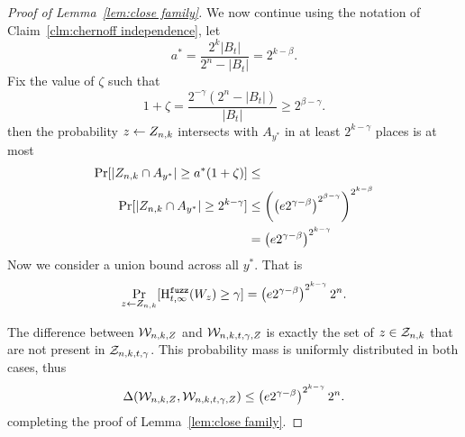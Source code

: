 \begin{proof}[Proof of Lemma~\ref{lem:close family}]
\noindent
We now continue using the notation of Claim~\ref{clm:chernoff independence}, let 
\[
a^* =\frac{2^k|B_t|}{2^n - |B_t|}=2^{k-\beta}.
\]
Fix the value of $\zeta$ such that 
\[1+\zeta = \frac{2^{-\gamma}(2^n - |B_t|)}{|B_t|} \ge 2^{\beta-\gamma}. \]
then the probability $z\leftarrow Z_{n,k}$ intersects with $A_{y^*}$ in at least $2^{k-\gamma}$ places is at most 
\begin{align*}
\Pr[|Z_{n,k} \cap A_{y^*}| \ge a^*(1+\zeta)] &\le \\
\Pr[| Z_{n,k} \cap A_{y^*} | \ge 2^{k-\gamma}] &\le \left(\left(e2^{\gamma-\beta}\right)^{2^{\beta-\gamma}}\right)^{2^{k-\beta}} \\&= \left(e2^{\gamma-\beta}\right)^{2^{k-\gamma}}
\end{align*}
Now we consider a union bound across all $y^*$.  That is
\[
\Pr_{z\leftarrow Z_{n,k} }[\mathrm{H}^{\mathtt{fuzz}}_{t,\infty}(W_z)\ge \gamma] = \left(e2^{\gamma-\beta}\right)^{2^{k-\gamma}}2^n.
\]

The difference between $\mathcal{W}_{n,k, Z}$ and $\mathcal{W}_{n,k,t,\gamma, Z}$ is exactly the set of $z\in\mathcal{Z}_{n,k}$ that are not present in $\mathcal{Z}_{n,k,t,\gamma}$.  This probability mass is uniformly distributed in both cases, thus 
\[
\Delta(\mathcal{W}_{n,k, Z}, \mathcal{W}_{n,k,t,\gamma, Z}) \le \left(e2^{\gamma-\beta}\right)^{2^{k-\gamma}}2^n.
\]
completing the proof of Lemma~\ref{lem:close family}.
\end{proof}

